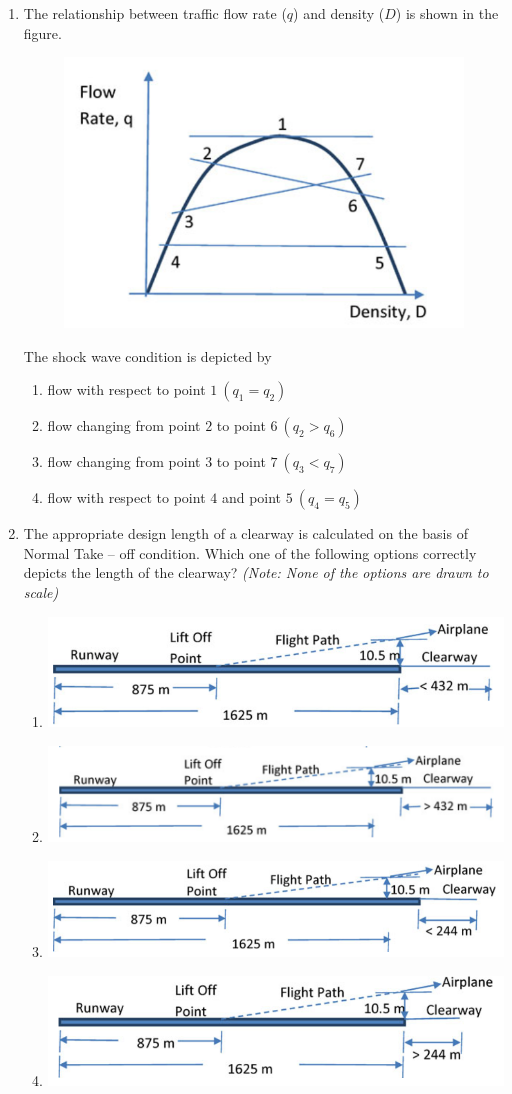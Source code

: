 \documentclass[journal]{IEEEtran}
\begin{document}
\begin{enumerate}
\item The relationship between traffic flow rate ($q$) and density ($D$) is shown in the figure.  

\begin{figure}[H]
    \centering
    \includegraphics[width=0.3\columnwidth]{figs/Q42.png} 
    \caption{}
    \label{fig:placeholder}
\end{figure}

The shock wave condition is depicted by   \hfill {}
\begin{enumerate}
\item flow with respect to point $1 \ (q_1 = q_2)$  
\item flow changing from point $2$ to point $6 \ (q_2 > q_6)$  
\item flow changing from point $3$ to point $7 \ (q_3 < q_7)$  
\item flow with respect to point $4$ and point $5 \ (q_4 = q_5)$  
\end{enumerate}

\item The appropriate design length of a clearway is calculated on the basis of Normal Take -- off condition. Which one of the following options correctly depicts the length of the clearway? \textit{(Note: None of the options are drawn to scale)}  
\hfill {}
\begin{enumerate}
\item \includegraphics[width=0.3\columnwidth]{figs/Q43a.png}   
\item \includegraphics[width=0.3\columnwidth]{figs/Q43b.png}  
\item \includegraphics[width=0.3\columnwidth]{figs/Q43c.png}  
\item \includegraphics[width=0.3\columnwidth]{figs/Q43d.png}  
\end{enumerate}


\end{enumerate}
\end{document}
